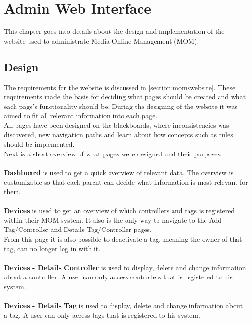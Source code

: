 \chapter{Admin Web Interface} %
\label{chap:website}
This chapter goes into details about the design and implementation of the website used to administrate Media-Online Management (MOM).

\section{Design}
The requirements for the website is discussed in \autoref{section:momswebsite}.
These requirements made the basis for deciding what pages should be created and what each page's functionality should be. During the designing of the website it was aimed to fit all relevant information into each page.\\
All pages have been designed on the blackboards, where inconsistencies was discovered, new navigation paths and learn about how concepts such as rules should be implemented.\\
Next is a short overview of what pages were designed and their purposes.\\
\\
\textbf{Dashboard} is used to get a quick overview of relevant data. The overview is customizable so that each parent can decide what information is most relevant for them.\\
\\
\textbf{Devices} is used to get an overview of which controllers and tags is registered within their MOM system. It also is the only way to navigate to the Add Tag/Controller and Details Tag/Controller pages.\\
From this page it is also possible to deactivate a tag, meaning the owner of that tag, can no longer log in with it.\\
\\
\textbf{Devices - Details Controller} is used to display, delete and change information about a controller. A user can only access controllers that is registered to his system.\\
\\
\textbf{Devices - Details Tag} is used to display, delete and change information about a tag. A user can only access tags that is registered to his system.\\
\\
